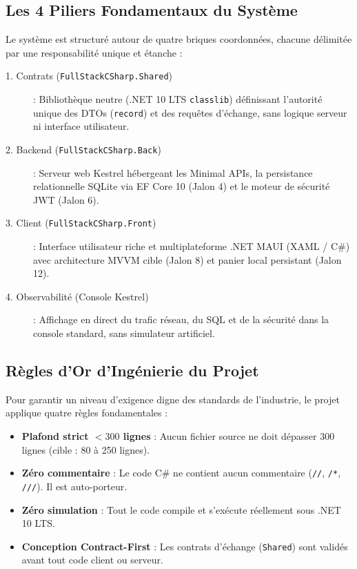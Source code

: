 \documentclass[a4paper,11pt]{report}
\begin{document}
\subsection*{Les 4 Piliers Fondamentaux du Système}

Le système est structuré autour de quatre briques coordonnées, chacune délimitée par une responsabilité unique et étanche :

\begin{description}
    \item[\color{cyanproj!90!black}1. Contrats (\texttt{FullStackCSharp.Shared})] : Bibliothèque neutre (.NET 10 LTS \texttt{classlib}) définissant l'autorité unique des DTOs (\texttt{record}) et des requêtes d'échange, sans logique serveur ni interface utilisateur.
    \item[\color{secondary}2. Backend (\texttt{FullStackCSharp.Back})] : Serveur web Kestrel hébergeant les Minimal APIs, la persistance relationnelle SQLite via EF Core 10 (Jalon 4) et le moteur de sécurité JWT (Jalon 6).
    \item[\color{indigo}3. Client (\texttt{FullStackCSharp.Front})] : Interface utilisateur riche et multiplateforme .NET MAUI (XAML / C\#) avec architecture MVVM cible (Jalon 8) et panier local persistant (Jalon 12).
    \item[\color{emerald!80!black}4. Observabilité (Console Kestrel)] : Affichage en direct du trafic réseau, du SQL et de la sécurité dans la console standard, sans simulateur artificiel.
\end{description}

\vspace{0.15cm}

\subsection*{Règles d'Or d'Ingénierie du Projet}

Pour garantir un niveau d'exigence digne des standards de l'industrie, le projet applique quatre règles fondamentales :
\begin{itemize}
    \item \textbf{Plafond strict $< 300$ lignes} : Aucun fichier source ne doit dépasser 300 lignes (cible : 80 à 250 lignes).
    \item \textbf{Zéro commentaire} : Le code C\# ne contient aucun commentaire (\texttt{//}, \texttt{/*}, \texttt{///}). Il est auto-porteur.
    \item \textbf{Zéro simulation} : Tout le code compile et s'exécute réellement sous .NET 10 LTS.
    \item \textbf{Conception Contract-First} : Les contrats d'échange (\texttt{Shared}) sont validés avant tout code client ou serveur.
\end{itemize}
\end{document}
